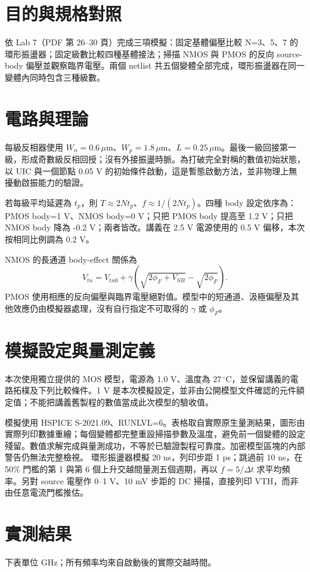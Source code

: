 \section{目的與規格對照}
依 Lab 7（PDF 第 26--30 頁）完成三項模擬：固定基體偏壓比較 N=3、5、7 的環形振盪器；固定級數比較四種基體接法；掃描 NMOS 與 PMOS 的反向 source-body 偏壓並觀察臨界電壓。兩個 netlist 共五個變體全部完成，環形振盪器在同一變體內同時包含三種級數。

\section{電路與理論}
每級反相器使用 $W_n=0.6\,\mu$m、$W_p=1.8\,\mu$m、$L=0.25\,\mu$m。最後一級回接第一級，形成奇數級反相回授；沒有外接振盪時脈。為打破完全對稱的數值初始狀態，以 UIC 與一個節點 0.05 V 的初始條件啟動，這是暫態啟動方法，並非物理上無擾動啟振能力的驗證。

若每級平均延遲為 $t_p$，則 $T\approx2Nt_p$、$f\approx1/(2Nt_p)$。四種 body 設定依序為：PMOS body=1 V、NMOS body=0 V；只把 PMOS body 提高至 1.2 V；只把 NMOS body 降為 -0.2 V；兩者皆改。講義在 2.5 V 電源使用的 0.5 V 偏移，本次按相同比例調為 0.2 V。

NMOS 的長通道 body-effect 關係為
\[V_{tn}=V_{tn0}+\gamma\left(\sqrt{2\phi_F+V_{SB}}-\sqrt{2\phi_F}\right).\]
PMOS 使用相應的反向偏壓與臨界電壓絕對值。模型中的短通道、汲極偏壓及其他效應仍由模擬器處理，沒有自行指定不可取得的 $\gamma$ 或 $\phi_F$。

\section{模擬設定與量測定義}
本次使用獨立提供的 MOS 模型，電源為 1.0 V、溫度為 $27\,^{\circ}$C，並保留講義的電路拓樸及下列比較條件。1 V 是本次模擬設定，並非由公開模型文件確認的元件額定值；不能把講義舊製程的數值當成此次模型的驗收值。

模擬使用 HSPICE S-2021.09、RUNLVL=6。表格取自實際原生量測結果，圖形由實際列印數據重繪；每個變體都完整重設掃描參數及溫度，避免前一個變體的設定殘留。數值求解完成與量測成功，不等於已驗證製程可靠度。加密模型區塊的內部警告仍無法完整檢視。
環形振盪器模擬 20 ns，列印步距 1 ps；跳過前 10 ns，在 50\% 門檻的第 1 與第 6 個上升交越間量測五個週期，再以 $f=5/\Delta t$ 求平均頻率。另對 source 電壓作 0--1 V、10 mV 步距的 DC 掃描，直接列印 VTH，而非由任意電流門檻推估。

\section{實測結果}
下表單位 GHz；所有頻率均來自啟動後的實際交越時間。


